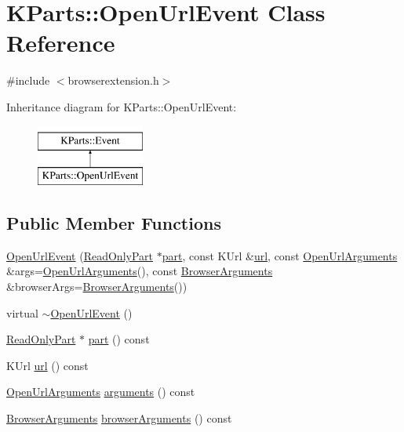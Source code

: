 \hypertarget{classKParts_1_1OpenUrlEvent}{\section{\-K\-Parts\-:\-:\-Open\-Url\-Event \-Class \-Reference}
\label{classKParts_1_1OpenUrlEvent}
}


{\ttfamily \#include $<$browserextension.\-h$>$}

\-Inheritance diagram for \-K\-Parts\-:\-:\-Open\-Url\-Event\-:\begin{figure}[H]
\begin{center}
\leavevmode
\includegraphics[height=2.000000cm]{classKParts_1_1OpenUrlEvent}
\end{center}
\end{figure}
\subsection*{\-Public \-Member \-Functions}
\begin{DoxyCompactItemize}
\item 
\hyperlink{classKParts_1_1OpenUrlEvent_af98b6f595f6aa62dca8d72ff54138ec9}{\-Open\-Url\-Event} (\hyperlink{classKParts_1_1ReadOnlyPart}{\-Read\-Only\-Part} $\ast$\hyperlink{classKParts_1_1OpenUrlEvent_a2c23bcde7fee2966c25dbd7d961b151b}{part}, const \-K\-Url \&\hyperlink{classKParts_1_1OpenUrlEvent_a910c8c089b7c863e49cd83ddf4b8f003}{url}, const \hyperlink{classKParts_1_1OpenUrlArguments}{\-Open\-Url\-Arguments} \&args=\hyperlink{classKParts_1_1OpenUrlArguments}{\-Open\-Url\-Arguments}(), const \hyperlink{structKParts_1_1BrowserArguments}{\-Browser\-Arguments} \&browser\-Args=\hyperlink{structKParts_1_1BrowserArguments}{\-Browser\-Arguments}())
\item 
virtual \hyperlink{classKParts_1_1OpenUrlEvent_aceb6c7fd12ae21889f779d7a074e02ca}{$\sim$\-Open\-Url\-Event} ()
\item 
\hyperlink{classKParts_1_1ReadOnlyPart}{\-Read\-Only\-Part} $\ast$ \hyperlink{classKParts_1_1OpenUrlEvent_a2c23bcde7fee2966c25dbd7d961b151b}{part} () const 
\item 
\-K\-Url \hyperlink{classKParts_1_1OpenUrlEvent_a910c8c089b7c863e49cd83ddf4b8f003}{url} () const 
\item 
\hyperlink{classKParts_1_1OpenUrlArguments}{\-Open\-Url\-Arguments} \hyperlink{classKParts_1_1OpenUrlEvent_a8a365e2cb9c4be571aa5c0c383280fa0}{arguments} () const 
\item 
\hyperlink{structKParts_1_1BrowserArguments}{\-Browser\-Arguments} \hyperlink{classKParts_1_1OpenUrlEvent_a410497aaab6fbe7c2ff0ab9ca86f32ab}{browser\-Arguments} () const 
\end{DoxyCompactItemize}
